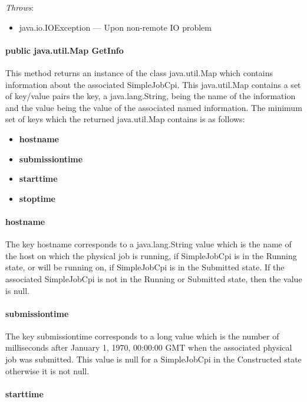 \documentclass[$Date: 2003/06/26 19:29:31 $]{glabarticle}
\begin{document}
\textit{Throws}:
\begin{itemize}
\item[] java.io.IOException --- Upon non-remote IO problem 
\end{itemize} 

\paragraph{public java.util.Map GetInfo}

This method returns an instance of the class java.util.Map which contains
information about the associated SimpleJobCpi. This java.util.Map contains a
set of key/value pairs the key, a java.lang.String, being the name of the
information and the value being the value of the associated named
information.  The minimum set of keys which the returned java.util.Map
contains is as follows:

\begin{itemize}
  \item \textbf{hostname}
  \item \textbf{submissiontime}
  \item \textbf{starttime}
  \item \textbf{stoptime}
\end{itemize}
\paragraph{hostname} 

The key hostname corresponds to a java.lang.String value which is the
name of the host on which the physical job is running, if SimpleJobCpi is
in the Running state, or will be running on, if SimpleJobCpi is in the
Submitted state. If the associated SimpleJobCpi is not in the Running or
Submitted state, then the value is null.

\paragraph{submissiontime} 

The key submissiontime corresponds to a long value which is
the number of milliseconds after January 1, 1970, 00:00:00 GMT when
the associated physical job was submitted. This value is null for a
SimpleJobCpi in the Constructed state otherwise it is not null.

\paragraph{starttime} 
\end{document}
